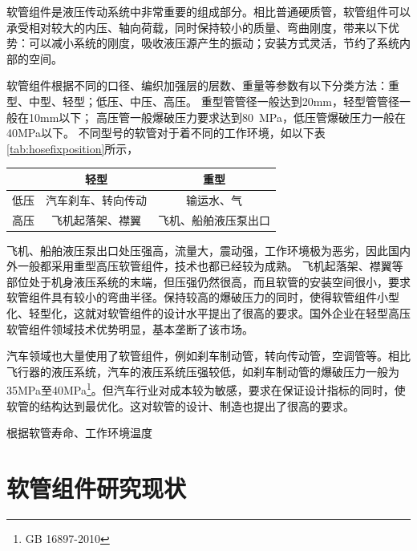 软管组件是液压传动系统中非常重要的组成部分。相比普通硬质管，软管组件可以承受相对较大的内压、轴向荷载，同时保持较小的质量、弯曲刚度，带来以下优势：可以减小系统的刚度，吸收液压源产生的振动；安装方式灵活，节约了系统内部的空间。







软管组件根据不同的口径、编织加强层的层数、重量等参数有以下分类方法：重型、中型、轻型；低压、中压、高压。
重型管管径一般达到20mm，轻型管管径一般在10mm以下；
高压管一般爆破压力要求达到\SI{80}{\mega\pascal}，低压管爆破压力一般在40MPa以下。
不同型号的软管对于着不同的工作环境，如以下表\ref{tab:hosefixposition}所示，




\begin{table}[!htbp]
	\centering
		
	\begin{tabular}{ccc}
		\toprule
		&    轻型     &     重型     \\ \hline
		低压 & 汽车刹车、转向传动 &  输运水、气  \\
		高压 & 飞机起落架、襟翼  & 飞机、船舶液压泵出口 \\ 
		\bottomrule
	\end{tabular} 
\end{table}

飞机、船舶液压泵出口处压强高，流量大，震动强，工作环境极为恶劣，因此国内外一般都采用重型高压软管组件，技术也都已经较为成熟。
飞机起落架、襟翼等部位处于机身液压系统的末端，但压强仍然很高，而且软管的安装空间很小，要求软管组件具有较小的弯曲半径。保持较高的爆破压力的同时，使得软管组件小型化、轻型化，这就对软管组件的设计水平提出了很高的要求。国外企业在轻型高压软管组件领域技术优势明显，基本垄断了该市场。

汽车领域也大量使用了软管组件，例如刹车制动管，转向传动管，空调管等。相比飞行器的液压系统，汽车的液压系统压强较低，如刹车制动管的爆破压力一般为35MPa至40MPa\footnote{GB 16897-2010}。但汽车行业对成本较为敏感，要求在保证设计指标的同时，使软管的结构达到最优化。这对软管的设计、制造也提出了很高的要求。

根据软管寿命、工作环境温度

 	 	 
					
\section{软管组件研究现状}

